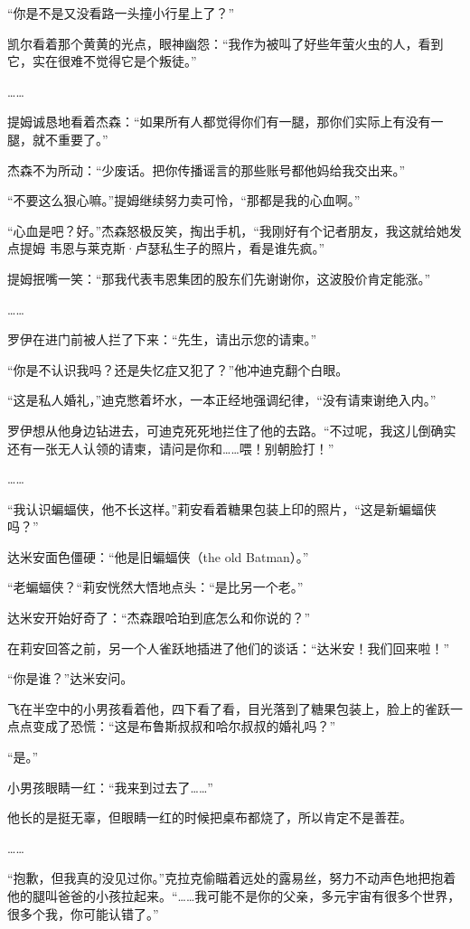 \documentclass[../main]{subfiles}
\begin{document}
“你是不是又没看路一头撞小行星上了？”

凯尔看着那个黄黄的光点，眼神幽怨：“我作为被叫了好些年萤火虫的人，看到它，实在很难不觉得它是个叛徒。”

……

提姆诚恳地看着杰森：“如果所有人都觉得你们有一腿，那你们实际上有没有一腿，就不重要了。”

杰森不为所动：“少废话。把你传播谣言的那些账号都他妈给我交出来。”

“不要这么狠心嘛。”提姆继续努力卖可怜，“那都是我的心血啊。”

“心血是吧？好。”杰森怒极反笑，掏出手机，“我刚好有个记者朋友，我这就给她发点提姆
韦恩与莱克斯·卢瑟私生子的照片，看是谁先疯。”

提姆抿嘴一笑：“那我代表韦恩集团的股东们先谢谢你，这波股价肯定能涨。”

……

罗伊在进门前被人拦了下来：“先生，请出示您的请柬。”

“你是不认识我吗？还是失忆症又犯了？”他冲迪克翻个白眼。

“这是私人婚礼，”迪克憋着坏水，一本正经地强调纪律，“没有请柬谢绝入内。”

罗伊想从他身边钻进去，可迪克死死地拦住了他的去路。“不过呢，我这儿倒确实还有一张无人认领的请柬，请问是你和……喂！别朝脸打！”

……

“我认识蝙蝠侠，他不长这样。”莉安看着糖果包装上印的照片，“这是新蝙蝠侠吗？”

达米安面色僵硬：“他是旧蝙蝠侠（the old Batman）。”

“老蝙蝠侠？“莉安恍然大悟地点头：“是比另一个老。”

达米安开始好奇了：“杰森跟哈珀到底怎么和你说的？”

在莉安回答之前，另一个人雀跃地插进了他们的谈话：“达米安！我们回来啦！”

“你是谁？”达米安问。

飞在半空中的小男孩看着他，四下看了看，目光落到了糖果包装上，脸上的雀跃一点点变成了恐慌：“这是布鲁斯叔叔和哈尔叔叔的婚礼吗？”

“是。”

小男孩眼睛一红：“我来到过去了……”

他长的是挺无辜，但眼睛一红的时候把桌布都烧了，所以肯定不是善茬。

……

“抱歉，但我真的没见过你。”克拉克偷瞄着远处的露易丝，努力不动声色地把抱着他的腿叫爸爸的小孩拉起来。“……我可能不是你的父亲，多元宇宙有很多个世界，很多个我，你可能认错了。”
\end{document}
